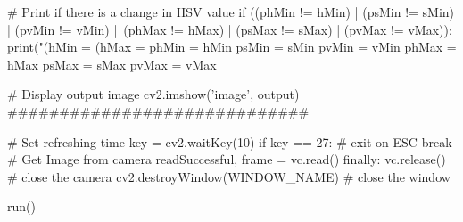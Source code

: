 \begin{pyverbatim}
                # Print if there is a change in HSV value
                if ((phMin != hMin) | (psMin != sMin) | (pvMin != vMin) |\
                 (phMax != hMax) | (psMax != sMax) | (pvMax != vMax)):
                    print("(hMin = %
                               (hMax = %
                    phMin = hMin
                    psMin = sMin
                    pvMin = vMin
                    phMax = hMax
                    psMax = sMax
                    pvMax = vMax

                # Display output image
                cv2.imshow('image', output)
                #############################

                # Set refreshing time
                key = cv2.waitKey(10)
                if key == 27:  # exit on ESC
                    break
                # Get Image from camera
                readSuccessful, frame = vc.read()
        finally:
            vc.release()  # close the camera
            cv2.destroyWindow(WINDOW_NAME)  # close the window


run()

\end{pyverbatim}

